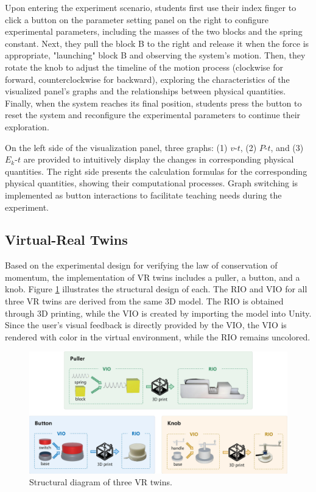 \documentclass[runningheads]{llncs}
\begin{document}
Upon entering the experiment scenario, students first use their index finger to click a button on the parameter setting panel on the right to configure experimental parameters, including the masses of the two blocks and the spring constant. Next, they pull the block B to the right and release it when the force is appropriate, "launching" block B and observing the system's motion. Then, they rotate the knob to adjust the timeline of the motion process (clockwise for forward, counterclockwise for backward), exploring the characteristics of the visualized panel's graphs and the relationships between physical quantities. Finally, when the system reaches its final position, students press the button to reset the system and reconfigure the experimental parameters to continue their exploration.

On the left side of the visualization panel, three graphs: (1) $v$-$t$, (2) $P$-$t$, and (3) $E_k$-$t$ are provided to intuitively display the changes in corresponding physical quantities. The right side presents the calculation formulas for the corresponding physical quantities, showing their computational processes. Graph switching is implemented as button interactions to facilitate teaching needs during the experiment.

\subsection{Virtual-Real Twins}
Based on the experimental design for verifying the law of conservation of momentum, the implementation of VR twins includes a puller, a button, and a knob. Figure \ref{fig:structural-diagram} illustrates the structural design of each. The RIO and VIO for all three VR twins are derived from the same 3D model. The RIO is obtained through 3D printing, while the VIO is created by importing the model into Unity. Since the user's visual feedback is directly provided by the VIO, the VIO is rendered with color in the virtual environment, while the RIO remains uncolored.

\begin{figure}[t]
  \centering
  \includegraphics[width=1\textwidth]{image/Structural-Diagram.pdf} %
  \caption{Structural diagram of three VR twins.}
  \label{fig:structural-diagram}
\end{figure}
\end{document}
